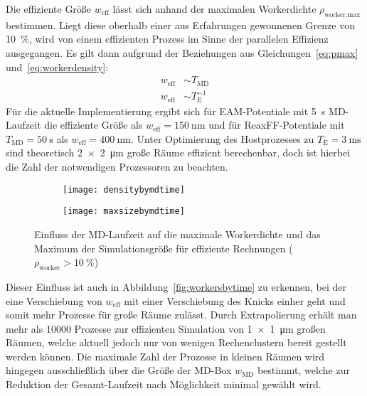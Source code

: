 Die effiziente Größe $w_\text{eff}$ lässt sich anhand der maximalen Workerdichte $\rho_\text{worker,max}$ bestimmen.
Liegt diese oberhalb einer aus Erfahrungen gewonnenen Grenze von \SI{10}{\percent}, wird von einem effizienten Prozess im Sinne der parallelen Effizienz ausgegangen.
Es gilt dann aufgrund der Beziehungen aus Gleichungen~\ref{eq:pmax} und~\ref{eq:workerdensity}:
\begin{align}
  w_\text{eff} & \sim T_\text{MD}     \\
  w_\text{eff} & \sim T_\text{E}^{-1}
\end{align}
Für die aktuelle Implementierung ergibt sich für EAM-Potentiale mit \SI{5}{\second} MD-Laufzeit die effiziente Größe als $w_\text{eff} = \SI{150}{\nano\meter}$ und für ReaxFF-Potentiale mit $T_\text{MD}=\SI{50}{\second}$ als $w_\text{eff} = \SI{400}{\nano\meter}$.
Unter Optimierung des Hostprozesses zu $T_\text{E} = \SI{3}{\milli\second}$ sind theoretisch \SI{2x2}{\micro\meter} große Räume effizient berechenbar, doch ist hierbei die Zahl der notwendigen Prozessoren zu beachten.

\begin{figure}[p]
  \captionsetup[subfigure]{singlelinecheck=false}
  \def\subfigwidth{7cm}
  \begin{subfigure}[t]{\subfigwidth}
    \texttt{[image: densitybymdtime]}
  \end{subfigure}
  \hfill
  \begin{subfigure}[t]{\subfigwidth}
    \texttt{[image: maxsizebymdtime]}
  \end{subfigure}

  \caption{Einfluss der MD-Laufzeit auf die maximale Workerdichte und das Maximum der Simulationsgröße für effiziente Rechnungen ($\rho_\text{worker} > \SI{10}{\percent}$)}
  \label{fig:densitymaxsize}

\end{figure}

Dieser Einfluss ist auch in Abbildung~\ref{fig:workersbytime} zu erkennen, bei der eine Verschiebung von $w_\text{eff}$ mit einer Verschiebung des Knicks einher geht und somit mehr Prozesse für große Räume zulässt.
Durch Extrapolierung erhält man mehr als \num{10000} Prozesse zur effizienten Simulation von \SI{1x1}{\micro\meter} großen Räumen, welche aktuell jedoch nur von wenigen Rechenclustern bereit gestellt werden können.
Die maximale Zahl der Prozesse in kleinen Räumen wird hingegen ausschließlich über die Größe der MD-Box $w_\text{MD}$ bestimmt, welche zur Reduktion der Gesamt-Laufzeit nach Möglichkeit minimal gewählt wird.

